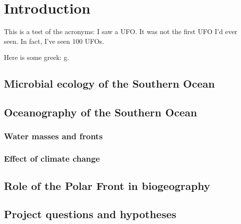 \chapter{Introduction} 
\label{ch:intro}

This is a test of the acronyms: I saw a \ac{UFO}. It was not the first \ac{UFO} I'd ever seen. In fact, I've seen 100 \acp{UFO}.

Here is some greek: \textmu{}g.

\section{Microbial ecology of the Southern Ocean}

\section{Oceanography of the Southern Ocean}
\subsection{Water masses and fronts}
\subsection{Effect of climate change}

\section{Role of the Polar Front in biogeography}
\section{Project questions and hypotheses}
